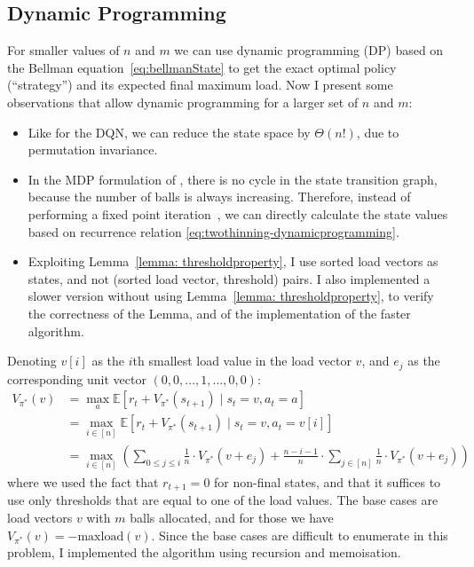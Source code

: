 \subsection{Dynamic Programming} \label{two-thinning-dp}


For smaller values of $n$ and $m$ we can use dynamic programming (DP) based on the Bellman equation~\ref{eq:bellmanState} to get the exact optimal policy (``\DP strategy'') and its expected final maximum load. Now I present some observations that allow dynamic programming for a larger set of $n$ and $m$:


\begin{itemize}
    \item 
    Like for the DQN, we can reduce the state space by $\Theta(n!)$, due to permutation invariance.
    \item
    In the MDP formulation of \TwoThinning, there is no cycle in the state transition graph, because the number of balls is always increasing. Therefore, instead of performing a fixed point iteration~\cite{rhoades1991fixedpointiteration}, we can directly calculate the state values based on recurrence relation \ref{eq:twothinning-dynamicprogramming}.
    \item
    Exploiting Lemma~\ref{lemma: thresholdproperty}, I use sorted load vectors as states, and not (sorted load vector, threshold) pairs. I also implemented a slower version without using Lemma~\ref{lemma: thresholdproperty}, to verify the correctness of the Lemma, and of the implementation of the faster algorithm.
\end{itemize}


Denoting $v[i]$ as the $i$th smallest load value in the load vector $v$, and $e_j$ as the corresponding unit vector $(0, 0, ... , 1, ..., 0, 0)$: 
\begin{equation} \label{eq:twothinning-dynamicprogramming}
\begin{split}
    V_{\pi^*}(v) &= \max_a \mathbb{E} [r_t + V_{\pi^*}(s_{t+1}) \mid s_t=v, a_t=a] \\
    &= \max_{i \in [n]} \mathbb{E} [r_t + V_{\pi^*}(s_{t+1}) \mid s_t=v, a_t=v[i]] \\
    &= \max_{i \in [n]} \left(\sum_{0\leq j \leq i} \frac{1}{n}\cdot V_{\pi^*}(v+e_j) + \frac{n-i-1}{n} \cdot  \sum_{j \in [n]} \frac{1}{n}\cdot V_{\pi^*}(v+e_j) \right)
\end{split}
\end{equation}
where we used the fact that $r_{t+1}=0$ for non-final states, and that it suffices to use only thresholds that are equal to one of the load values. The base cases are load vectors $v$ with $m$ balls allocated, and for those we have $V_{\pi^*}(v)=-\mathrm{maxload}(v)$. Since the base cases are difficult to enumerate in this problem, I implemented the algorithm using recursion and memoisation. 


